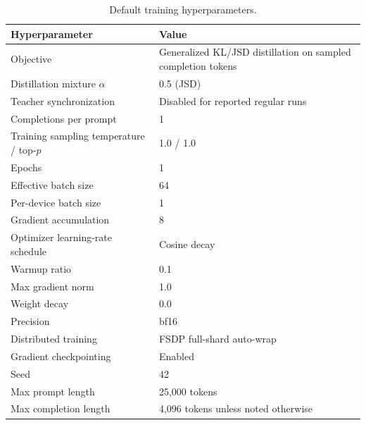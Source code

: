\begin{table}[!htbp]
    \centering
    \small
    \caption{Default \opsd{} training hyperparameters.}
    \label{tab:opsd-training-hparams}
    \begin{tabular}{ll}
        \toprule
        Hyperparameter & Value \\
        \midrule
        Objective & Generalized KL/JSD distillation on sampled completion tokens \\
        Distillation mixture $\alpha$ & 0.5 (JSD) \\
        Teacher synchronization & Disabled for reported regular runs \\
        Completions per prompt & 1 \\
        Training sampling temperature / top-$p$  & 1.0 / 1.0  \\
        Epochs & 1 \\
        Effective batch size & 64 \\
        Per-device batch size & 1 \\
        Gradient accumulation & 8 \\
        Optimizer learning-rate schedule & Cosine decay \\
        Warmup ratio & 0.1 \\
        Max gradient norm & 1.0 \\
        Weight decay & 0.0 \\
        Precision & bf16 \\
        Distributed training & FSDP full-shard auto-wrap \\
        Gradient checkpointing & Enabled \\
        Seed & 42 \\
        Max prompt length & 25,000 tokens \\
        Max completion length & 4,096 tokens unless noted otherwise \\
        \bottomrule
    \end{tabular}
\end{table}

